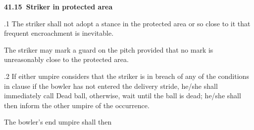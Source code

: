 \documentclass[12pt]{article}
\begin{document}
\vspace{\baselineskip}
{\fontsize{11pt}{13.2pt}\selectfont \textbf{41.15\  Striker in protected area}\par}\par


\vspace{\baselineskip}
\begin{adjustwidth}{0.5in}{0.31in}
{\fontsize{9pt}{10.8pt}.1 The striker shall not adopt a stance in the protected area or so close to it that frequent encroachment is inevitable.\par}\par

\end{adjustwidth}


\vspace{\baselineskip}
\begin{adjustwidth}{0.5in}{0.31in}
{\fontsize{9pt}{10.8pt}\selectfont The striker may mark a guard on the pitch provided that no mark is unreasonably close to the protected area.\par}\par

\end{adjustwidth}


\vspace{\baselineskip}
\begin{adjustwidth}{0.5in}{0.06in}
{\fontsize{9pt}{10.8pt}.2 If either umpire considers that the striker is in breach of any of the conditions in clause if the bowler has not entered the delivery stride, he/she shall immediately call Dead ball, otherwise, wait until the ball is dead; he/she shall then inform the other umpire of the occurrence.\par}\par

\end{adjustwidth}


\vspace{\baselineskip}
\begin{adjustwidth}{0.5in}{0.0in}
{\fontsize{9pt}{10.8pt}\selectfont The bowler’s end umpire shall then\par}\par

\end{adjustwidth}
\end{document}
